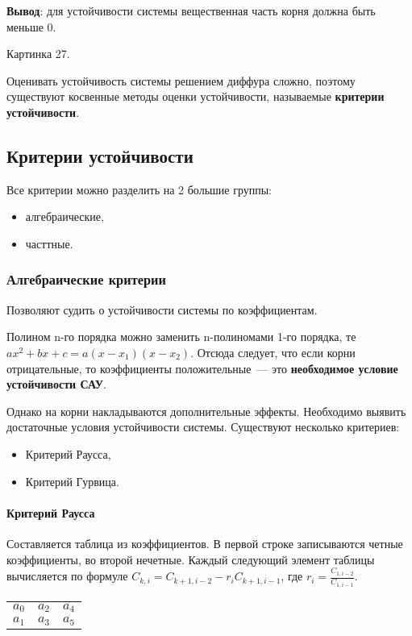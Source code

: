 \textbf{Вывод}: для устойчивости системы вещественная часть корня должна быть меньше 0. 

Картинка 27.

Оценивать устойчивость системы решением диффура сложно, поэтому существуют косвенные методы оценки устойчивости, называемые \textbf{критерии устойчивости}.

\subsection{Критерии устойчивости}
Все критерии можно разделить на 2 большие группы:
\begin{itemize}
	\item алгебраические,
	\item часттные.
\end{itemize}

\subsubsection{Алгебраические критерии}
Позволяют судить о устойчивости системы по коэффициентам.

Полином n-го порядка можно заменить n-полиномами 1-го порядка, те $ax^2+bx+c=a(x-x_1)(x-x_2)$. Отсюда следует, что если корни отрицательные, то коэффициенты положительные~--- это \textbf{необходимое условие устойчивости САУ}.

Однако на корни накладываются дополнительные эффекты. Необходимо выявить достаточные условия устойчивости системы. Существуют несколько критериев:
\begin{itemize}
	\item Критерий Раусса,
	\item Критерий Гурвица.
\end{itemize}

\paragraph{Критерий Раусса}
Составляется таблица из коэффициентов. В первой строке записываются четные коэффициенты, во второй нечетные. Каждый следующий элемент таблицы вычисляется по формуле $C_{k,i}=C_{k+1,i-2}-r_iC_{k+1,i-1}$, где $r_i=\frac{C_{1,i-2}}{C_{1,i-1}}$.

\begin{longtable}{*{3}{|c}|}
	&&\\
	\hline
	$a_0$ & $a_2$ & $a_4$\\
	\hline
	$a_1$ & $a_3$ & $a_5$\\
	\hline
\end{longtable}

